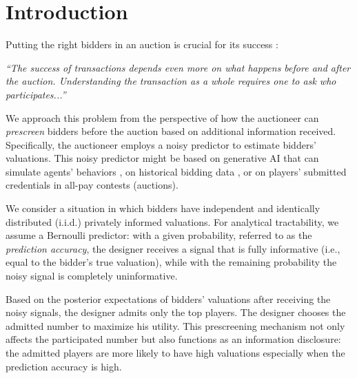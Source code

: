\section{Introduction}\label{sec:intro}



Putting the right bidders in an auction is crucial for its success \citep{milgrom_2004_putting_auctiontheory_to_work}:
\begin{center}
   \textit{``The success of transactions depends even more on what happens before and after the auction. Understanding the transaction as a whole requires one to ask who participates...''}
\end{center}
We approach this problem from the perspective of how the auctioneer can \textit{prescreen} bidders before the auction based on additional information received. Specifically, the auctioneer employs a noisy predictor to estimate bidders' valuations. This noisy predictor might be based on generative AI that can simulate agents' behaviors \citep{immorlica_2024_generative}, on historical bidding data \citep{munoz_2017_auctions_predictions, lu_2024_competitiveauctions_predictions}, or on players' submitted credentials in all-pay contests (auctions).



We consider a situation in which bidders have independent and identically distributed (i.i.d.) privately informed valuations. For analytical tractability, we assume a Bernoulli predictor: with a given probability, referred to as the \emph{prediction accuracy}, the designer receives a signal that is fully informative (i.e., equal to the bidder's true valuation), while with the remaining probability the noisy signal is completely uninformative.




Based on the posterior expectations of bidders' valuations after receiving the noisy signals, the designer admits only the top players. The designer chooses the admitted number to maximize his utility. This prescreening mechanism not only affects the participated number but also functions as an information disclosure: the admitted players are more likely to have high valuations especially when the prediction accuracy is high.


